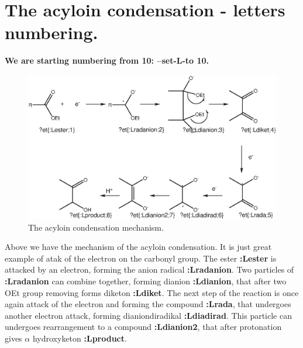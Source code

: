 \documentclass[a4paper,12pt,final]{article}
\newcommand{\nrzw}[1]{{\Huge{\textbf{#1}}}}
\begin{document}
\section{The acyloin condensation - letters numbering.}
\begin{center}
\textbf{We are starting numbering from 10: --set-L-to 10.}
\end{center}
\begin{figure}[htp]
\includegraphics[width=1\textwidth]{reaction_letters.eps}
\caption{The acyloin condensation mechanism.}
\end{figure}
Above we have the mechanism of the acyloin condensation. It is just great example of atak of the electron on the carbonyl group. The ester
 \nrzw{:Lester} is attacked by an electron, forming the anion radical \nrzw{:Lradanion}. Two particles of \nrzw{:Lradanion} can combine together,
  forming dianion \nrzw{:Ldianion}, that after two OEt group removing forms diketon \nrzw{:Ldiket}. The next step of the reaction is once again attack of
   the electron and forming the compound \nrzw{:Lrada}, that undergoes another electron attack, forming dianiondiradikal \nrzw{:Ldiadirad}. This
    particle can undergoes rearrangement to a compound \nrzw{:Ldianion2}, that after protonation gives $\alpha$ hydroxyketon \nrzw{:Lproduct}.
\end{document}
